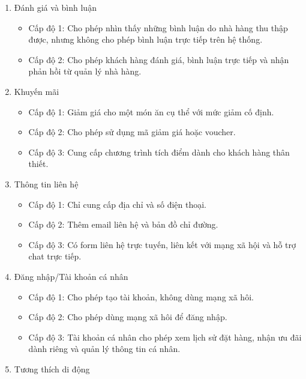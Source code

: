 \begin{enumerate}
\begin{itemize}
                \end{itemize}
            \item Đánh giá và bình luận
                \begin{itemize}
                    \item Cấp độ 1: Cho phép nhìn thấy những bình luận do nhà hàng thu thập được, nhưng không cho phép bình luận trực tiếp trên hệ thống.
                    \item Cấp độ 2: Cho phép khách hàng đánh giá, bình luận trực tiếp và nhận phản hồi từ quản lý nhà hàng.
                \end{itemize}
            \item Khuyến mãi
                \begin{itemize}
                    \item Cấp độ 1: Giảm giá cho một món ăn cụ thể với mức giảm cố định.
                    \item Cấp độ 2: Cho phép sử dụng mã giảm giá hoặc voucher.
                    \item Cấp độ 3: Cung cấp chương trình tích điểm dành cho khách hàng thân thiết.
                \end{itemize}
            \item Thông tin liên hệ
                \begin{itemize}
                    \item Cấp độ 1: Chỉ cung cấp địa chỉ và số điện thoại.
                    \item Cấp độ 2: Thêm email liên hệ và bản đồ chỉ đường.
                    \item Cấp độ 3: Có form liên hệ trực tuyến, liên kết với mạng xã hội và hỗ trợ chat trực tiếp.
                \end{itemize}
            \item Đăng nhập/Tài khoản cá nhân
                \begin{itemize}
                    \item Cấp độ 1: Cho phép tạo tài khoản, không dùng mạng xã hôi.
                    \item Cấp độ 2: Cho phép dùng mạng xã hôi để đăng nhập.
                    \item Cấp độ 3: Tài khoản cá nhân cho phép xem lịch sử đặt hàng, nhận ưu đãi dành riêng và quản lý thông tin cá nhân.
                \end{itemize}
            \item Tương thích di động
                \begin{itemize}

\end{itemize}
\end{enumerate}

